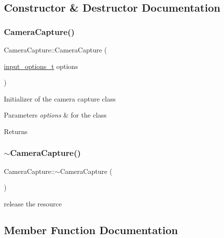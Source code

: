 \subsection{Constructor \& Destructor Documentation}
\mbox{\label{class_camera_capture_acc2084c1dbede6786f3c6ac3d0f87253}} 
\subsubsection{\texorpdfstring{CameraCapture()}{CameraCapture()}}
{\footnotesize\ttfamily Camera\+Capture\+::\+Camera\+Capture (\begin{DoxyParamCaption}\item[{\mbox{\hyperlink{struct_camera_capture_1_1input__options__t}{input\+\_\+options\+\_\+t}}}]{options }\end{DoxyParamCaption})}

Initializer of the camera capture class 
\begin{DoxyParams}{Parameters}
{\em options} & for the class \\
\hline
\end{DoxyParams}
\begin{DoxyReturn}{Returns}

\end{DoxyReturn}
\mbox{\label{class_camera_capture_a9fb9058c34d463b8bf9055b2f129adac}} 
\subsubsection{\texorpdfstring{$\sim$CameraCapture()}{~CameraCapture()}}
{\footnotesize\ttfamily Camera\+Capture\+::$\sim$\+Camera\+Capture (\begin{DoxyParamCaption}{ }\end{DoxyParamCaption})}

release the resource 

\subsection{Member Function Documentation}
\mbox{\label{class_camera_capture_a67265c7fc4dfe416c2692074914ac1eb}} 
